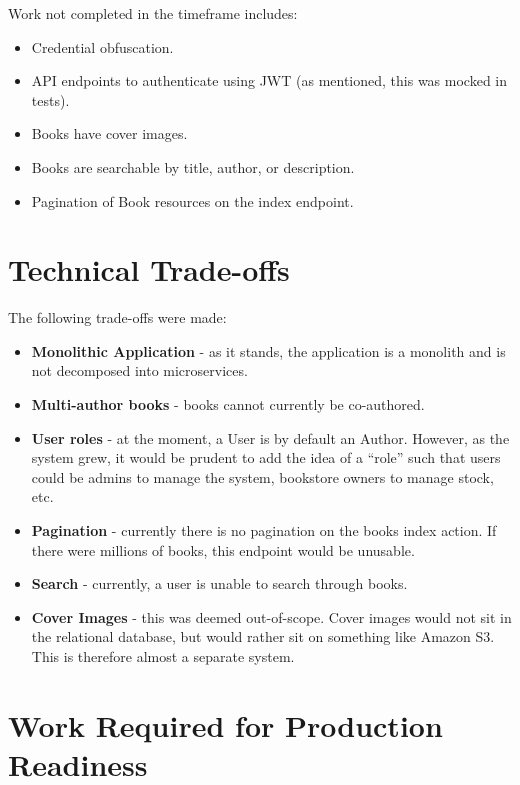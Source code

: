\documentclass[a4paper]{article}
\begin{document}
Work not completed in the timeframe includes:

\begin{itemize}
  \item Credential obfuscation.
  \item API endpoints to authenticate using JWT (as mentioned, this was mocked
  in tests).
  \item Books have cover images.
  \item Books are searchable by title, author, or description.
  \item Pagination of Book resources on the index endpoint.
\end{itemize}

\section{Technical Trade-offs}
\label{sec:trade_offs}

The following trade-offs were made:

\begin{itemize}
  \item \textbf{Monolithic Application} - as it stands, the application is a
  monolith and is not decomposed into microservices.
  \item \textbf{Multi-author books} - books cannot currently be co-authored.
  \item \textbf{User roles} - at the moment, a User is by default an Author. However, as
  the system grew, it would be prudent to add the idea of a ``role'' such that
  users could be admins to manage the system, bookstore owners to manage stock,
  etc.
  \item \textbf{Pagination} - currently there is no pagination on the books
  index action. If there were millions of books, this endpoint would be unusable.
  \item \textbf{Search} - currently, a user is unable to search through books.
  \item \textbf{Cover Images} - this was deemed out-of-scope. Cover images would
  not sit in the relational database, but would rather sit on something like
  Amazon S3. This is therefore almost a separate system.
\end{itemize}

\section{Work Required for Production Readiness}
\label{sec:production}
\end{document}
